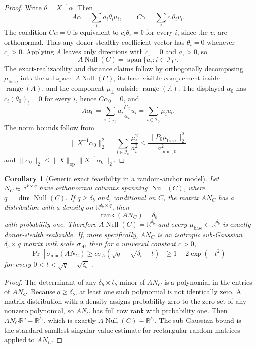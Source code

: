 \documentclass{article}
\theoremstyle{plain}
\newtheorem{corollary}[theorem]{Corollary}
\theoremstyle{definition}
\theoremstyle{remark}
\begin{document}
\begin{proof}
Write $\theta=X^{-1}\alpha$. Then
\[
A\alpha=\sum_i a_i\theta_i u_i,
\qquad
C\alpha=\sum_i c_i\theta_i v_i.
\]
The condition $C\alpha=0$ is equivalent to $c_i\theta_i=0$ for every $i$, since the $v_i$ are orthonormal. Thus any donor-stealthy coefficient vector has $\theta_i=0$ whenever $c_i>0$. Applying $A$ leaves only directions with $c_i=0$ and $a_i>0$, so
\[
A\operatorname{Null}(C)=\operatorname{span}\{u_i:i\in\mathcal{I}_0\}.
\]
The exact-realizability and distance claims follow by orthogonally decomposing $\mu_{\text{base}}$ into the subspace $A\operatorname{Null}(C)$, its base-visible complement inside $\operatorname{range}(A)$, and the component $\mu_\perp$ outside $\operatorname{range}(A)$. The displayed $\alpha_0$ has $c_i(\theta_0)_i=0$ for every $i$, hence $C\alpha_0=0$, and
\[
A\alpha_0=\sum_{i\in\mathcal{I}_0}a_i\frac{\mu_i}{a_i}u_i
=
\sum_{i\in\mathcal{I}_0}\mu_i u_i.
\]
The norm bounds follow from
\[
\|X^{-1}\alpha_0\|_2^2
=
\sum_{i\in\mathcal{I}_0}\frac{\mu_i^2}{a_i^2}
\le
\frac{\|P_0\mu_{\text{base}}\|_2^2}{a_{\min,0}^2}
\]
and $\|\alpha_0\|_2\le \|X\|_{\mathrm{op}}\|X^{-1}\alpha_0\|_2$.
\end{proof}

\begin{corollary}[Generic exact feasibility in a random-anchor model]
\label{cor:random-anchor-realizability}
Let $N_C\in\mathbb{R}^{k\times q}$ have orthonormal columns spanning $\operatorname{Null}(C)$, where $q=\dim\operatorname{Null}(C)$. If $q\ge \delta_b$ and, conditional on $C$, the matrix $AN_C$ has a distribution with a density on $\mathbb{R}^{\delta_b\times q}$, then
\[
\operatorname{rank}(AN_C)=\delta_b
\]
with probability one. Therefore $A\operatorname{Null}(C)=\mathbb{R}^{\delta_b}$ and every $\mu_{\text{base}}\in\mathbb{R}^{\delta_b}$ is exactly donor-stealth realizable. If, more specifically, $AN_C$ is an isotropic sub-Gaussian $\delta_b\times q$ matrix with scale $\sigma_A$, then for a universal constant $c>0$,
\[
\Pr\left[\sigma_{\min}(AN_C)\ge c\sigma_A(\sqrt{q}-\sqrt{\delta_b}-t)\right]
\ge
1-2\exp(-t^2)
\]
for every $0<t<\sqrt{q}-\sqrt{\delta_b}$ \citep{rudelsonvershynin2009smallest}.
\end{corollary}

\begin{proof}
The determinant of any $\delta_b\times\delta_b$ minor of $AN_C$ is a polynomial in the entries of $AN_C$. Because $q\ge \delta_b$, at least one such polynomial is not identically zero. A matrix distribution with a density assigns probability zero to the zero set of any nonzero polynomial, so $AN_C$ has full row rank with probability one. Then $AN_C\mathbb{R}^q=\mathbb{R}^{\delta_b}$, which is exactly $A\operatorname{Null}(C)=\mathbb{R}^{\delta_b}$. The sub-Gaussian bound is the standard smallest-singular-value estimate for rectangular random matrices applied to $AN_C$.
\end{proof}
\end{document}
